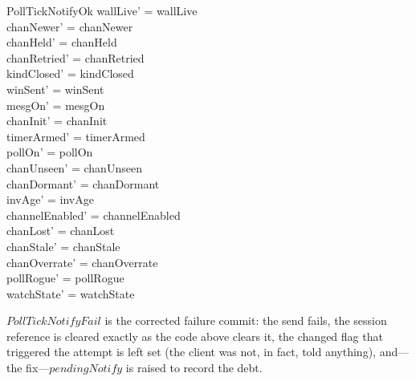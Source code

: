 \documentclass[a4paper,10pt,fleqn]{article}
\begin{document}
\begin{schema}{PollTickNotifyOk}
  wallLive' = wallLive \\
  chanNewer' = chanNewer \\
  chanHeld' = chanHeld \\
  chanRetried' = chanRetried \\
  kindClosed' = kindClosed \\
  winSent' = winSent \\
  mesgOn' = mesgOn \\
  chanInit' = chanInit \\
  timerArmed' = timerArmed \\
  pollOn' = pollOn \\
  chanUnseen' = chanUnseen \\
  chanDormant' = chanDormant \\
  invAge' = invAge \\
  channelEnabled' = channelEnabled \\
  chanLost' = chanLost \\
  chanStale' = chanStale \\
  chanOverrate' = chanOverrate \\
  pollRogue' = pollRogue \\
  watchState' = watchState
\end{schema}

$PollTickNotifyFail$ is the corrected failure commit: the send fails,
the session reference is cleared exactly as the code above clears it,
the changed flag that triggered the attempt is left set (the client
was not, in fact, told anything), and---the fix---$pendingNotify$ is
raised to record the debt.
\end{document}
